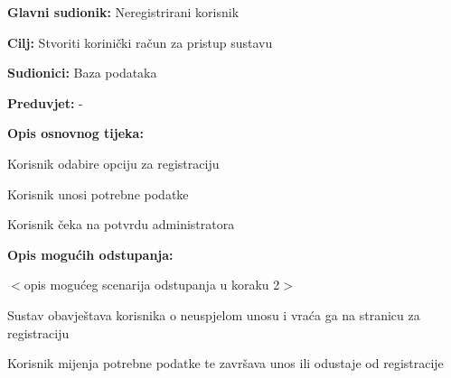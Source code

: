 					\noindent {}
					\begin{packed_item}
	
						\item \textbf{Glavni sudionik: }Neregistrirani korisnik
						\item  \textbf{Cilj:} Stvoriti korinički račun za pristup sustavu
						\item  \textbf{Sudionici:} Baza podataka
						\item  \textbf{Preduvjet:} -
						\item  \textbf{Opis osnovnog tijeka:}
						
						\item[] \begin{packed_enum}
	
							\item Korisnik odabire opciju za registraciju
							\item Korisnik unosi potrebne podatke
							\item Korisnik čeka na potvrdu administratora
						\end{packed_enum}
						
						\item  \textbf{Opis mogućih odstupanja:}
						
						\item[] \begin{packed_item}
	
							\item[2.a] $<$opis mogućeg scenarija odstupanja u koraku 2$>$
							\item[] \begin{packed_enum}
								
								\item Sustav obavještava korisnika o neuspjelom unosu i vraća ga na stranicu za registraciju
								\item Korisnik mijenja potrebne podatke te završava unos ili odustaje od registracije
								
							\end{packed_enum}
							
						\end{packed_item}
					\end{packed_item}
				
